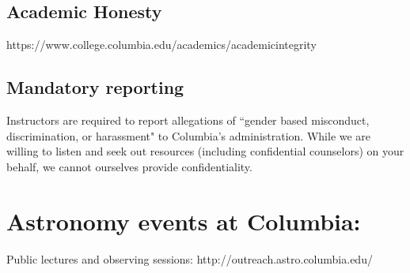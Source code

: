 \documentclass[11pt]{article}
\begin{document}
\subsection*{Academic Honesty}
https://www.college.columbia.edu/academics/academicintegrity
 
\subsection*{Mandatory reporting}
Instructors are required to report allegations of ``gender based misconduct, discrimination, or harassment" to Columbia's administration. While we are willing to listen and seek out resources (including confidential counselors) on your behalf, we cannot ourselves provide confidentiality.

\section*{Astronomy events at Columbia:}
Public lectures and observing sessions: http://outreach.astro.columbia.edu/
\end{document}
